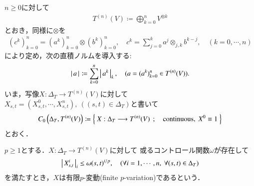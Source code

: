 	$n \geq 0$に対して
	\begin{align}
		T^{(n)}(V) \coloneqq \bigoplus_{k=0}^{n} V^{\otimes k}
	\end{align}
	とおき，同様に$\otimes$を
	\begin{align}
		(c^k)_{k=0}^n = (a^k)_{k=0}^n \otimes (b^k)_{k=0}^n,
		\quad c^k = \sum_{j=0}^{k} a^j \otimes_{j,k} b^{k-j},
		\quad (k=0,\cdots,n)
	\end{align}
	により定め，次の直積ノルムを導入する:
	\begin{align}
		\left|\, a\, \right|_{} \coloneqq \sum_{k=0}^n \left|\, a^k\, \right|_{k},
		\quad (a = (a^k)_{k=0}^n \in T^{(n)}(V)).
		\label{eq:def_norm_on_truncated_tensor_algebra}
	\end{align}
	いま，写像$X:\Delta_T \longrightarrow T^{(n)}(V)$に対して
	$X_{s,t} = (X^0_{s,t},\cdots,X^n_{s,t}),\ ((s,t) \in \Delta_T)$と書いて
	\begin{align}
		C_0 \left(\Delta_T,T^{(n)}(V) \right)
		\coloneqq \left\{\ X:\Delta_T \longrightarrow T^{(n)}(V)\ \, ; \quad \mbox{continuous},\ X^0 \equiv 1\ \right\}
	\end{align}
	とおく．
	
	\begin{screen}
		\begin{dfn}
			$p \geq 1$とする．$X:\Delta_T \longrightarrow T^{(n)}(V)$に対して
			或るコントロール関数$\omega$が存在して
			\begin{align}
				\left|\, X^i_{s,t}\, \right|_{i} \leq \omega(s,t)^{i/p},
				\quad (\forall i=1,\cdots,n,\ \forall (s,t) \in \Delta_T)
				\label{eq:def_finite_p_variation}
			\end{align}
			を満たすとき，$X$は有限$p$-変動(finite $p$-variation)であるという．\footnotemark
		\end{dfn}
	\end{screen}
	
